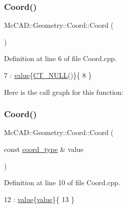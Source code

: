 \subsubsection{\texorpdfstring{Coord()}{Coord()}\hspace{0.1cm}{\footnotesize\ttfamily [1/4]}}
{\footnotesize\ttfamily Mc\+C\+A\+D\+::\+Geometry\+::\+Coord\+::\+Coord (\begin{DoxyParamCaption}{ }\end{DoxyParamCaption})}



Definition at line 6 of file Coord.\+cpp.


\begin{DoxyCode}
7     : \hyperlink{classMcCAD_1_1Geometry_1_1Coord_a540aea93d3b1a9cfd505e1e0b96b2b91}{value}\{\hyperlink{namespaceMcCAD_1_1Geometry_a7a1a1f1e3e0547cde4d81dec1a126c28}{CT\_NULL}()\}\{
8 \}
\end{DoxyCode}
Here is the call graph for this function\+:
\mbox{\label{classMcCAD_1_1Geometry_1_1Coord_ad7eda8b6ae03bf1d59b802295448129a}} 
\subsubsection{\texorpdfstring{Coord()}{Coord()}\hspace{0.1cm}{\footnotesize\ttfamily [2/4]}}
{\footnotesize\ttfamily Mc\+C\+A\+D\+::\+Geometry\+::\+Coord\+::\+Coord (\begin{DoxyParamCaption}\item[{const \hyperlink{namespaceMcCAD_1_1Geometry_ac043b37a4a7e849fca22869e1982d2f8}{coord\+\_\+type} \&}]{value }\end{DoxyParamCaption})}



Definition at line 10 of file Coord.\+cpp.


\begin{DoxyCode}
12     : \hyperlink{classMcCAD_1_1Geometry_1_1Coord_a540aea93d3b1a9cfd505e1e0b96b2b91}{value}\{\hyperlink{classMcCAD_1_1Geometry_1_1Coord_a540aea93d3b1a9cfd505e1e0b96b2b91}{value}\}\{
13 \}
\end{DoxyCode}
\mbox{\label{classMcCAD_1_1Geometry_1_1Coord_a5af9c049884e5436d4bdd92a05d201bb}} 
